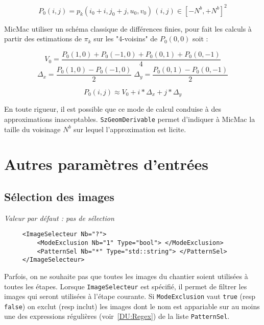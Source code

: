 \begin{equation}
    P_0(i,j) = p_k(i_0+i,j_0+j,u_0,v_0) \, (i,j) \in [-N^b,+N^b]^2
\end{equation}

MicMac utiliser un sch\'ema classique de diff\'erences finies, pour
fait les calculs \`a partir des estimations de $\pi_k$ sur les
"4-voisins" de $P_0(0,0)$ soit :

\begin{equation}
      V_0 = \frac{P_0(1,0)+P_0(-1,0)+P_0(0,1)+P_0(0,-1)}{4}
\end{equation}
\begin{equation}
      \Delta_x = \frac{P_0(1,0)-P_0(-1,0)}{2} \;
      \Delta_y = \frac{P_0(0,1)-P_0(0,-1)}{2} 
\end{equation}

\begin{equation}
        P_0(i,j) \approx  V_0 + i *\Delta_x + j*\Delta_y
\end{equation}

En toute rigueur, il est possible que  ce mode de calcul conduise  \`a 
des approximations  inacceptables. {\tt SzGeomDerivable} permet d'indiquer
\`a MicMac la taille du voisinage $N^b$ sur lequel l'approximation
est licite.



\section{Autres param\`etres d'entr\'ees}

\subsection{S\'election des images}

\emph{Valeur par d\'efaut : pas de s\'election}

\begin{verbatim}
     <ImageSelecteur Nb="?">
         <ModeExclusion Nb="1" Type="bool"> </ModeExclusion>
         <PatternSel Nb="*" Type="std::string"> </PatternSel>
     </ImageSelecteur>
\end{verbatim}

Parfois, on ne souhaite pas que toutes les images du chantier
soient utilis\'ees \`a toutes les \'etapes. Lorsque {\tt ImageSelecteur}
est sp\'ecifi\'e, il permet de filtrer les images qui seront
utilis\'ees \`a l'\'etape courante. Si {\tt  ModeExclusion}
vaut {\tt true} (resp {\tt false}) on exclut  (resp inclut)
les images dont le nom est appariable sur au moins une des
expressions r\'eguli\`eres (voir~\ref{DU:Regex})  de la liste  {\tt PatternSel}.


